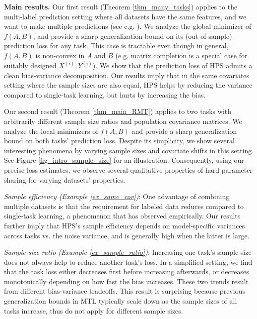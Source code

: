 \textbf{Main results.}
Our first result (Theorem \ref{thm_many_tasks}) applies to the multi-label prediction setting where all datasets have the same features, and we want to make multiple predictions (see e.g. \cite{hsu2009multi}).
We analyze the global minimizer of $f(A, B)$, and provide a sharp generalization bound on its (out-of-sample) prediction loss for any task.
This case is tractable even though in general, $f(A, B)$ is non-convex in $A$ and $B$ (e.g. matrix completion is a special case for suitably designed $X^{(i)}, Y^{(i)}$).
We show that the prediction loss of HPS admits a clean bias-variance decomposition.
Our results imply that in the same covariates setting where the sample sizes are also equal, HPS helps by reducing the variance compared to single-task learning, but hurts by increasing the bias.

Our second result (Theorem \ref{thm_main_RMT}) applies to two tasks with arbitrarily different sample size ratios and population covariance matrices.
We analyze the local minimizers of $f(A, B)$ and provide a sharp generalization bound on both tasks' prediction loss.
Despite its simplicity, we show several interesting phenomena by varying sample sizes and covariate shifts in this setting.
See Figure \ref{fig_intro_sample_size} for an illustration.
Consequently, using our precise loss estimates, we observe several qualitative properties of hard parameter sharing for varying datasets' properties.

\textit{Sample efficiency (Example \ref{ex_same_cov})}:
	One advantage of combining multiple datasets is that the requirement for labeled data reduces compared to single-task learning, a phenomenon that \citet{ZSSGM18} has observed empirically.
	Our results further imply that HPS's sample efficiency depends on model-specific variances across tasks vs. the noise variance, and is generally high when the latter is large.

\textit{Sample size ratio (Example \ref{ex_sample_ratio})}: Increasing one task's sample size does not always help to reduce another task's loss. In a simplified setting, we find that the task loss either decreases first before increasing afterwards, or decreases monotonically depending on how fast the bias increases. These two trends result from different bias-variance tradeoffs. This result is surprising because previous generalization bounds in MTL typically scale down as the sample sizes of all tasks increase, thus do not apply for different sample sizes.

